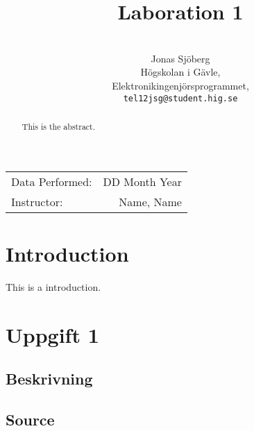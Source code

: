 \documentclass[11pt,a4paper]{article}
\title{Laboration 1}
\author{\\
  Jonas Sjöberg\\
  Högskolan i Gävle,\\
  Elektronikingenjörsprogrammet,\\
  \texttt{tel12jsg@student.hig.se}}
\date{}
\begin{document}
\maketitle

\begin{center}
\begin{tabular}{l r}
    Data Performed: & DD Month Year \\
    Instructor: & Name, Name
\end{tabular}
\end{center}

\begin{abstract}
This is the abstract.
\end{abstract}

\newpage

{
\setcounter{tocdepth}{3}
\tableofcontents
}

\newpage

\section{Introduction}\label{setup}
This is a introduction.

\section{Uppgift 1}\label{section-1}

\subsection{Beskrivning}



\subsection{Source}\label{subsection-1}
\end{document}
